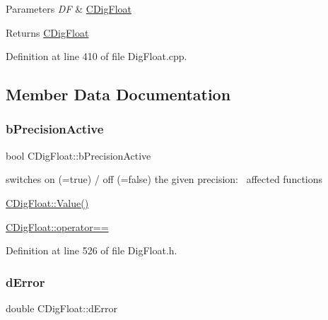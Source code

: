 \begin{DoxyParams}{Parameters}
{\em DF} & \hyperlink{classCDigFloat}{C\+Dig\+Float} \\
\hline
\end{DoxyParams}
\begin{DoxyReturn}{Returns}
\hyperlink{classCDigFloat}{C\+Dig\+Float} 
\end{DoxyReturn}


Definition at line 410 of file Dig\+Float.\+cpp.



\subsection{Member Data Documentation}
\mbox{\label{classCDigFloat_aa1f6ed0312a2aa6ae5ee2abd195adefc}} 
\subsubsection{\texorpdfstring{b\+Precision\+Active}{bPrecisionActive}}
{\footnotesize\ttfamily bool C\+Dig\+Float\+::b\+Precision\+Active\hspace{0.3cm}{\ttfamily [protected]}}



switches on (=true) / off (=false) the given precision\+:~\newline
 affected functions 


\begin{DoxyItemize}
\item \hyperlink{classCDigFloat_af74b8cd0935294b6371f551b7a1ff640}{C\+Dig\+Float\+::\+Value()}
\item \hyperlink{classCDigFloat_ad8980d984bf2bab71d15b830fd0180a5}{C\+Dig\+Float\+::operator==} 
\end{DoxyItemize}

Definition at line 526 of file Dig\+Float.\+h.

\mbox{\label{classCDigFloat_a25eb3782d1e727ff007a48f8308e3d4d}} 
\subsubsection{\texorpdfstring{d\+Error}{dError}}
{\footnotesize\ttfamily double C\+Dig\+Float\+::d\+Error\hspace{0.3cm}{\ttfamily [protected]}}



